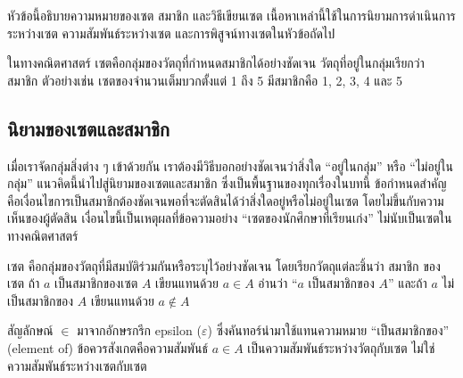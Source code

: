 หัวข้อนี้อธิบายความหมายของเซต สมาชิก และวิธีเขียนเซต เนื้อหาเหล่านี้ใช้ในการนิยามการดำเนินการระหว่างเซต ความสัมพันธ์ระหว่างเซต และการพิสูจน์ทางเซตในหัวข้อถัดไป~\parencite{enderton1977settheory}

ในทางคณิตศาสตร์ เซตคือกลุ่มของวัตถุที่กำหนดสมาชิกได้อย่างชัดเจน วัตถุที่อยู่ในกลุ่มเรียกว่า สมาชิก ตัวอย่างเช่น เซตของจำนวนเต็มบวกตั้งแต่ 1 ถึง 5 มีสมาชิกคือ 1, 2, 3, 4 และ 5

\subsection{นิยามของเซตและสมาชิก}
เมื่อเราจัดกลุ่มสิ่งต่าง ๆ เข้าด้วยกัน เราต้องมีวิธีบอกอย่างชัดเจนว่าสิ่งใด ``อยู่ในกลุ่ม'' หรือ ``ไม่อยู่ในกลุ่ม'' แนวคิดนี้นำไปสู่นิยามของเซตและสมาชิก ซึ่งเป็นพื้นฐานของทุกเรื่องในบทนี้ ข้อกำหนดสำคัญคือเงื่อนไขการเป็นสมาชิกต้องชัดเจนพอที่จะตัดสินได้ว่าสิ่งใดอยู่หรือไม่อยู่ในเซต โดยไม่ขึ้นกับความเห็นของผู้ตัดสิน เงื่อนไขนี้เป็นเหตุผลที่ข้อความอย่าง ``เซตของนักศึกษาที่เรียนเก่ง'' ไม่นับเป็นเซตในทางคณิตศาสตร์~\parencite{lipschutz1998settheory}

\begin{definition}[เซตและสมาชิก]
เซต คือกลุ่มของวัตถุที่มีสมบัติร่วมกันหรือระบุไว้อย่างชัดเจน โดยเรียกวัตถุแต่ละชิ้นว่า สมาชิก ของเซต ถ้า $a$ เป็นสมาชิกของเซต $A$ เขียนแทนด้วย $a \in A$ อ่านว่า ``$a$ เป็นสมาชิกของ $A$'' และถ้า $a$ ไม่เป็นสมาชิกของ $A$ เขียนแทนด้วย $a \notin A$
\label{def:set-membership}
\end{definition}

สัญลักษณ์ $\in$ มาจากอักษรกรีก epsilon ($\varepsilon$) ซึ่งคันทอร์นำมาใช้แทนความหมาย ``เป็นสมาชิกของ'' (element of) ข้อควรสังเกตคือความสัมพันธ์ $a \in A$ เป็นความสัมพันธ์ระหว่างวัตถุกับเซต ไม่ใช่ความสัมพันธ์ระหว่างเซตกับเซต~\parencite{lipschutz1998settheory}

